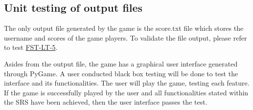\documentclass[12pt, titlepage]{article}
\begin{document}
\subsection{Unit testing of output files}		

The only output file generated by the game is the score.txt file which stores the username and scores of the game players. To validate the file output, please refer to test \hyperref[output_file]{FST-LT-5}.

Asides from the output file, the game has a graphical user interface generated through PyGame. A user conducted black box testing will be done to test the interface and its functionalities. The user will play the game, testing each feature. If the game is successfully played by the user and all functionalities stated within the SRS have been achieved, then the user interface passes the test.






\newpage
\end{document}
